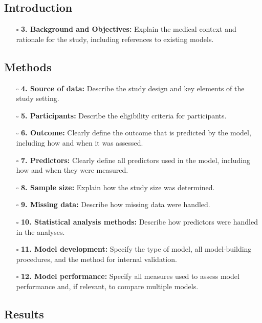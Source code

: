 \documentclass[11pt]{article}
\def\tightlist{}
\begin{document}
\begin{Form}
\subsection{Introduction}\label{introduction}

\begin{itemize}
\tightlist
\item[$\square$]
  \textbf{3. Background and Objectives:} Explain the medical context and
  rationale for the study, including references to existing models.
\end{itemize}

\subsection{Methods}\label{methods}

\begin{itemize}
\tightlist
\item[$\square$]
  \textbf{4. Source of data:} Describe the study design and key elements
  of the study setting.
\item[$\square$]
  \textbf{5. Participants:} Describe the eligibility criteria for
  participants.
\item[$\square$]
  \textbf{6. Outcome:} Clearly define the outcome that is predicted by
  the model, including how and when it was assessed.
\item[$\square$]
  \textbf{7. Predictors:} Clearly define all predictors used in the
  model, including how and when they were measured.
\item[$\square$]
  \textbf{8. Sample size:} Explain how the study size was determined.
\item[$\square$]
  \textbf{9. Missing data:} Describe how missing data were handled.
\item[$\square$]
  \textbf{10. Statistical analysis methods:} Describe how predictors
  were handled in the analyses.
\item[$\square$]
  \textbf{11. Model development:} Specify the type of model, all
  model-building procedures, and the method for internal validation.
\item[$\square$]
  \textbf{12. Model performance:} Specify all measures used to assess
  model performance and, if relevant, to compare multiple models.
\end{itemize}

\subsection{Results}\label{results}


\end{Form}
\end{document}
